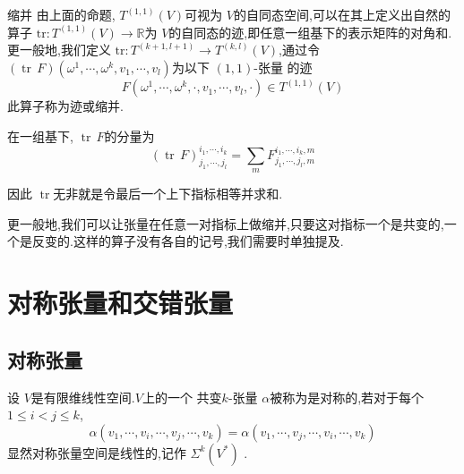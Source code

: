 \documentclass[../../几何与拓扑.tex]{subfiles}
\begin{document}
\begin{definition}{缩并}
    由上面的命题, \(  T^{\left( 1,1 \right) }\left( V \right)   \)可视为 \(  V  \)的自同态空间,可以在其上定义出自然的算子
     \(  \mathrm{tr}: T^{\left( 1,1 \right) }\left( V \right)\to \mathbb{R}    \)为  \(  V  \)的自同态的迹,即任意一组基下的表示矩阵的对角和.    
     更一般地,我们定义 \(  \mathrm{tr}: T^{\left( k+ 1,l + 1 \right) }\to T^{\left( k,l \right) }\left( V \right)   \),通过令 \(  \left( \operatorname{tr}\,F \right)\left(   \omega^1,\cdots,\omega^k , v_1,\cdots,v_l  \right)    \)为以下 \(  \left( 1,1 \right)   \)-张量 的迹 \[
     F\left(  \omega^1,\cdots,\omega^k ,\cdot , v_1,\cdots,v_l ,\cdot  \right) \in T^{\left( 1,1 \right) }\left( V \right)  
     \]   此算子称为迹或缩并.
\end{definition}

\begin{proposition}
    在一组基下, \(  \operatorname{tr}\,F  \)的分量为 \[
    \left( \operatorname{tr}\,F \right) ^{ i_1,\cdots,i_k }_{ j_1,\cdots,j_l } =  \sum _{m} F^{ i_1,\cdots,i_k, m}_{ j_1,\cdots,j_l ,m}
    \] 
\end{proposition}

\begin{note}
    因此 \(  \operatorname{tr}  \)无非就是令最后一个上下指标相等并求和. 
\end{note}

\begin{remark}
    更一般地,我们可以让张量在任意一对指标上做缩并,只要这对指标一个是共变的,一个是反变的.这样的算子没有各自的记号,我们需要时单独提及.
\end{remark}


\section{对称张量和交错张量}

\subsection{对称张量}

\begin{definition}
    设 $ V $是有限维线性空间.$ V $上的一个 共变$ k $-张量 $ \alpha $被称为是对称的,若对于每个 $ 1\le i <j\le k $, $$
    \alpha\left( v_1,\cdots ,v_{i},\cdots ,v_{j},\cdots ,v_{k} \right)= \alpha\left( v_1,\cdots ,v_{j},\cdots ,v_{i},\cdots ,v_{k} \right)  
    $$ 显然对称张量空间是线性的,记作 $ \Sigma^{k}\left( V^{*} \right)  $ .
\end{definition}
\end{document}

